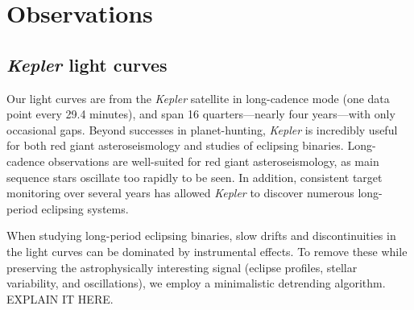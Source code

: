\section{Observations}\label{data}

\subsection{\emph{Kepler} light curves}\label{kepler}
Our light curves are from the \emph{Kepler} satellite in long-cadence mode (one data point every 29.4 minutes), and span 16 quarters---nearly four years---with only occasional gaps. Beyond successes in planet-hunting, \emph{Kepler} is incredibly useful for both red giant asteroseismology and studies of eclipsing binaries. Long-cadence observations are well-suited for red giant asteroseismology, as main sequence stars oscillate too rapidly to be seen. In addition, consistent target monitoring over several years has allowed \emph{Kepler} to discover numerous long-period eclipsing systems.

When studying long-period eclipsing binaries, slow drifts and discontinuities in the light curves can be dominated by instrumental effects. To remove these while preserving the astrophysically interesting signal (eclipse profiles, stellar variability, and oscillations), we employ a minimalistic detrending algorithm. EXPLAIN IT HERE.


